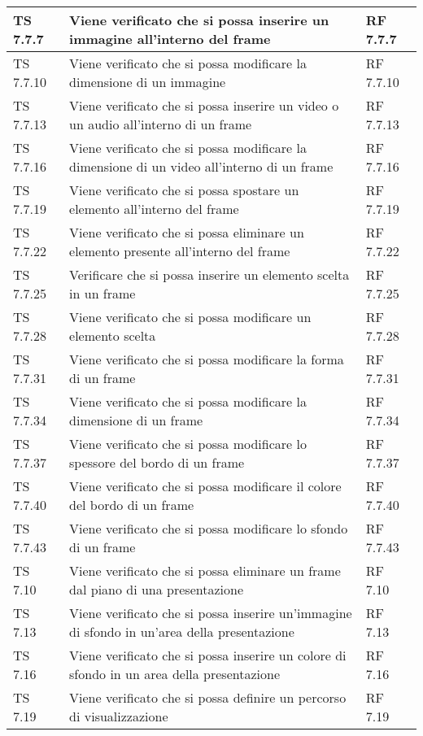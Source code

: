{{\begin{longtable} [c]{| p{3cm} | p{6cm} |p{3cm}|}
			\hline
			TS 7.7.7 & Viene verificato che si possa inserire un immagine all'interno del frame\ped{g} & RF 7.7.7\\
			\hline
			TS 7.7.10 & Viene verificato che si possa modificare la dimensione di un immagine & RF 7.7.10\\
			\hline
			TS 7.7.13 & Viene verificato che si possa inserire un video o un audio all'interno di un frame\ped{g} & RF 7.7.13\\
			\hline
			TS 7.7.16 & Viene verificato che si possa modificare la dimensione di un video all'interno di un frame\ped{g} & RF 7.7.16\\
			\hline
			TS 7.7.19 & Viene verificato che si possa spostare un elemento all'interno del frame\ped{g} & RF 7.7.19\\
			\hline
			TS 7.7.22 & Viene verificato che si possa eliminare un elemento presente all'interno del frame\ped{g} & RF 7.7.22 \\
			\hline
			TS 7.7.25 & Verificare che si possa inserire un elemento scelta\ped{g} in un frame & RF 7.7.25\\
			\hline
			TS 7.7.28 & Viene verificato che si possa modificare un elemento scelta & RF 7.7.28\\
			\hline
			TS 7.7.31 & Viene verificato che si possa modificare la forma di un frame\ped{g} & RF 7.7.31\\
			\hline
			TS 7.7.34 & Viene verificato che si possa modificare la dimensione di un frame & RF 7.7.34\\
			\hline
			TS 7.7.37 & Viene verificato che si possa modificare  lo spessore del bordo di un frame\ped{g} & RF 7.7.37\\
			\hline
			TS 7.7.40 & Viene verificato che si possa modificare il colore del bordo di un frame\ped{g} & RF 7.7.40\\
			\hline
			TS 7.7.43 & Viene verificato che si possa modificare lo sfondo di un frame\ped{g} & RF 7.7.43\\
			\hline
			TS 7.10 & Viene verificato che si possa eliminare un frame\ped{g} dal piano di una presentazione & RF 7.10\\
			\hline
			TS 7.13 & Viene verificato che si possa inserire un'immagine di sfondo in un'area della presentazione & RF 7.13 \\
			\hline
			TS 7.16 & Viene verificato che si possa inserire un colore di sfondo in un area della presentazione & RF 7.16\\
			\hline
			TS 7.19 & Viene verificato che si possa definire un percorso\ped{g} di visualizzazione & RF 7.19\\

\end{longtable}}}
